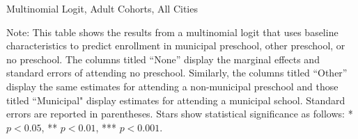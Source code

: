 \begin{table}[H]
\centering
\caption{Multinomial Logit, Adult Cohorts,  All Cities} \label{mlogit_all}
\begin{threeparttable}

\begin{tablenotes}
\footnotesize\raggedright{Note: This table shows the results from a multinomial logit that uses baseline characteristics to predict enrollment in municipal preschool, other preschool, or no preschool. The columns titled ``None'' display the marginal effects and standard errors of attending no preschool. Similarly, the columns titled ``Other'' display the same estimates for attending a non-municipal preschool and those titled ``Municipal" display estimates for attending a municipal school. Standard errors are reported in parentheses. Stars show statistical significance as follows: * $p < 0.05$, ** $p < 0.01$, *** $p < 0.001$.}
\end{tablenotes}
\end{threeparttable}
\end{table}

